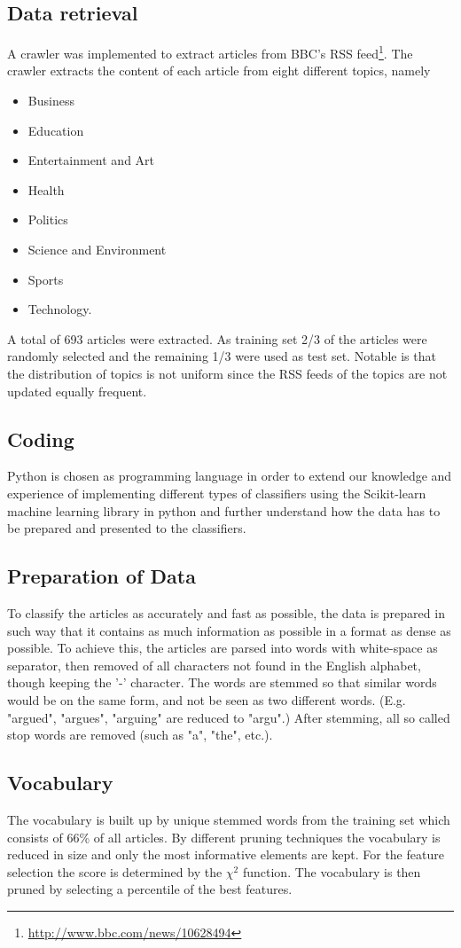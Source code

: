 \subsection{Data retrieval}
A crawler was implemented to extract articles from BBC's RSS feed\footnote{\url{http://www.bbc.com/news/10628494}}. The crawler extracts the content of each article from eight different topics, namely
\begin{itemize}[noitemsep,nolistsep]
	\item Business
	\item Education
	\item Entertainment and Art
	\item Health
	\item Politics
	\item Science and Environment
	\item Sports
	\item Technology.
\end{itemize}
A total of 693 articles were extracted. As training set 2/3 of the articles were randomly selected and the remaining 1/3 were used as test set. Notable is that the distribution of topics is not uniform since the RSS feeds of the topics are not updated equally frequent. 
\subsection{Coding}
Python is chosen as programming language in order to extend our knowledge and experience of implementing different types of classifiers using the Scikit-learn machine learning library in python and further understand how the data has to be prepared and presented to the classifiers.
\subsection{Preparation of Data}
To classify the articles as accurately and fast as possible, the data is prepared in such way that it contains as much information as possible in a format as dense as possible. To achieve this, the articles are parsed into words with white-space as separator, then removed of all characters not found in the English alphabet, though keeping the '-' character. The words are stemmed so that similar words would be on the same form, and not be seen as two different words. (E.g. "argued", "argues", "arguing" are reduced to "argu".) After stemming, all so called stop words are removed (such as "a", "the", etc.). 
\subsection{Vocabulary}
The vocabulary is built up by unique stemmed words from the training set which consists of 66\% of all articles. By different pruning techniques the vocabulary is reduced in size and only the most informative elements are kept. For the feature selection the score is determined by the $\chi^2$ function. The vocabulary is then pruned by selecting a percentile of the best features.
